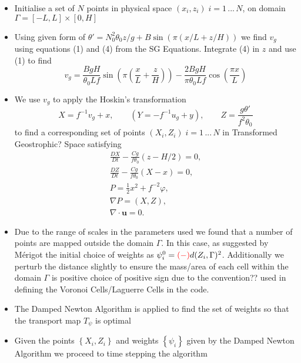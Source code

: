 \documentclass[]{article}
\begin{document}
	\begin{itemize}
	\item Initialise a set of $N$ points in physical space $(x_i,z_i) \; i = 1\,...\,N$, on domain $\Gamma = [-L,L] \times [0,H]$
	\item Using given form of $\theta ' = N_0^2 \theta_0 z /g + B\sin(\pi(x/L +z/H))$ we find $v_g$ using equations (1) and (4) from the SG Equations. Integrate (4) in $z$ and use (1) to find 
	\begin{equation}
		v_g = \frac{BgH}{\theta_0 Lf}\sin\left( \pi \left( \frac{x}{L} + \frac{z}{H}\right)\right) - \frac{2BgH}{\pi \theta_0 Lf}\cos\left(\frac{\pi x}{L}\right)
	\end{equation}
	\item We use $v_g$ to apply the Hoskin's transformation \cite{Hoskins1975}
	\begin{equation*}
	X = f^{-1}v_g + x,\qquad \left(Y = -f^{-1}u_g + y\right), \qquad Z = \frac{g\theta'}{f^2\theta_0}
	\end{equation*}
	to find a corresponding set of points $(X_i,Z_i) \; i = 1 \,...\,N$ in Transformed \color{red} Geostrophic?\color{black} Space satisfying
	\begin{align*}
	\frac{DX}{Dt} -\frac{Cg}{f\theta _0}\left(z-H/2\right) = 0,\\
	\frac{DZ}{Dt} - \frac{Cg}{f\theta _0}\left(X-x\right) = 0,\\
	P = \frac{1}{2}x^2 + f^{-2}\varphi,\\
	\nabla P = \left( X, Z\right),\\
	\nabla \cdot \bm{u} = 0.
	\end{align*}
	\item Due to the range of scales in the parameters used we found that a number of points are mapped outside the domain $\Gamma$. In this case, as suggested by M\'{e}rigot \cite{Merigot2017} the initial choice of weights as $\psi_i^0 = \color{red}(-)\color{black}d(Z_i,\Gamma)^2$. Additionally we perturb the distance slightly to ensure the mass/area of each cell within the domain $\Gamma$ is positive \color{red} choice of positive sign due to the convention?? used in defining the Voronoi Cells/Laguerre Cells in the code.\color{black} 
	\item The Damped Newton Algorithm is applied to find the set of weights so that the transport map $T_\psi$ is optimal 
	\item Given the points $\left\lbrace X_i,Z_i\right\rbrace $ and weights $\left\lbrace \psi_i \right\rbrace $ given by the Damped Newton Algorithm we proceed to time stepping the algorithm
	 \end{itemize}
\end{document}
